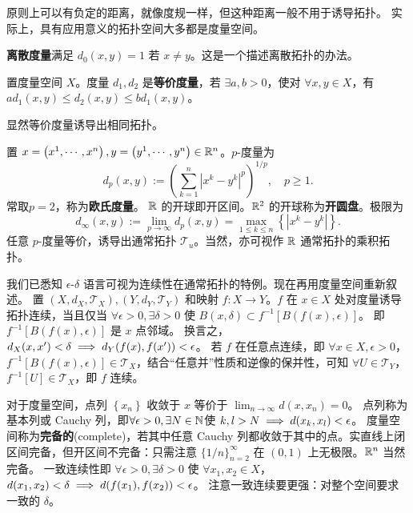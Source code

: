 \begin{remark}
    原则上可以有负定的距离，就像度规一样，但这种距离一般不用于诱导拓扑。
    实际上，具有应用意义的拓扑空间大多都是度量空间。
\end{remark}

\begin{eg}
    \textbf{离散度量}满足 $d_{0}(x,y)=1$ 若 $x \ne y$。这是一个描述离散拓扑的办法。
\end{eg}

\begin{definition}
    置度量空间 $X$。度量 $d_{1},d_{2}$ 是\textbf{等价度量}，若 $\exists a,b>0$，使对 $\forall x,y \in X$，有 $a d_{1}(x, y) \leqslant d_{2}(x, y) \leqslant b d_{1}(x, y)$。
\end{definition}

\begin{remark}
    显然等价度量诱导出相同拓扑。
\end{remark}

\begin{eg}
    置 $x=\left(x^1,\cdots,x^{n}\right),y=\left(y^{1},\cdots,y^{n}\right)\in\mathbb{R}^{n}$。$p$-度量为
\[
d_{p}(x, y):=\left(\sum_{k=1}^{n}\left|x^{k}-y^{k}\right|^{p}\right)^{1 / p},\quad p \geqslant 1.
\]
常取$p=2$，称为\textbf{欧氏度量}。
$\mathbb{R}$ 的开球即开区间。$\mathbb{R}^2$ 的开球称为\textbf{开圆盘}。极限为
\[
d_{\infty}(x,y):=\lim_{p\to\infty}d_{p}(x, y)=\max _{1 \leqslant k \leqslant n}\left\{\left|x^{k}-y^{k}\right|\right\}.
\]
任意 $p$-度量等价，诱导出通常拓扑 $\mathscr T_u$。当然，亦可视作 $\mathbb{R}$ 通常拓扑的乘积拓扑。
\end{eg}

我们已悉知 $\epsilon$-$\delta$ 语言可视为连续性在通常拓扑的特例。现在再用度量空间重新叙述。
置 $(X,d_X,\mathscr T_X),(Y,d_Y,\mathscr T_Y)$ 和映射 $f:X\to Y$。$f$ 在 $x \in X$ 处对度量诱导拓扑连续，当且仅当 $\forall\epsilon>0,\exists\delta>0$ 使 $B(x,\delta) \subset f^{−1} [B(f(x),\epsilon)]$。
即 $f^{−1} [B(f(x),\epsilon)]$ 是 $x$ 点邻域。
换言之，$d_X(x,x^{\prime})<\delta\implies d_Y(f(x),f(x^{\prime}))<\epsilon$。
若 $f$ 在任意点连续，即 $\forall x \in X,\epsilon > 0$，$f^{−1} [B(f(x),\epsilon)]\in\mathscr T_X$，结合“任意并”性质和逆像的保并性，可知 $\forall U\in\mathscr T_Y$，$f^{−1}[U]\in\mathscr T_X$，即 $f$ 连续。

对于度量空间，点列 $\left\{x_n\right\}$ 收敛于 $x$ 等价于 $\lim_{n\to\infty}d(x, x_n)=0$。
点列称为基本列或 Cauchy 列，即$\forall\epsilon>0,\exists N\in\mathbb{N}$使 $k,l>N\implies d(x_{k},x_{l})<\epsilon$。
度量空间称为\textbf{完备的}(complete)，若其中任意 Cauchy 列都收敛于其中的点。实直线上闭区间完备，但开区间不完备：只需注意 $\{1/n\}_{n=2}^\infty$ 在 $(0,1)$ 上无极限。$\mathbb{R}^{n}$ 当然完备。
一致连续性即 $\forall \epsilon>0,\exists\delta>0$ 
使 $\forall x_{1},x_{2} \in X$，$d(x_{1},x_{2})<\delta\implies d(f(x_{1}),f(x_{2}))<\epsilon$。
注意一致连续要更强：对整个空间要求一致的 $\delta$。

